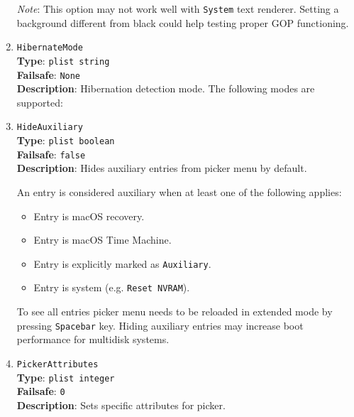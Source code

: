 \documentclass[]{article}
\providecommand{\tightlist}{%
  \setlength{\itemsep}{0pt}\setlength{\parskip}{0pt}}
\providecommand{\DIFaddtex}[1]{{\protect\color{blue}\uwave{#1}}} %
\providecommand{\DIFdeltex}[1]{{\protect\color{red}\sout{#1}}}                      %
\providecommand{\DIFaddbegin}{\global\booltrue{DIFkeeppage}\global\booltrue{DIFchange}} %
\providecommand{\DIFaddend}{\global\booltrue{DIFkeeppage}\global\boolfalse{DIFchange}} %
\providecommand{\DIFdelbegin}{\global\booltrue{DIFkeeppage}\global\booltrue{DIFchange}} %
\providecommand{\DIFdelend}{\global\booltrue{DIFkeeppage}\global\boolfalse{DIFchange}} %
\providecommand{\DIFadd}[1]{\texorpdfstring{\DIFaddtex{#1}}{#1}} %
\providecommand{\DIFdel}[1]{\texorpdfstring{\DIFdeltex{#1}}{}} %
\begin{document}
\begin{enumerate}
  \emph{Note}: This option may not work well with \texttt{System} text renderer.
  Setting a background different from black could help testing proper GOP functioning.

\item
  \texttt{HibernateMode}\\
  \textbf{Type}: \texttt{plist\ string}\\
  \textbf{Failsafe}: \texttt{None}\\
  \textbf{Description}: Hibernation detection mode. The following modes are supported:


\item
  \texttt{HideAuxiliary}\\
  \textbf{Type}: \texttt{plist\ boolean}\\
  \textbf{Failsafe}: \texttt{false}\\
  \textbf{Description}: Hides auxiliary entries from picker menu by default.

  An entry is considered auxiliary when at least one of the following applies:

  \begin{itemize}
  \tightlist
    \item Entry is macOS recovery.
    \item Entry is macOS Time Machine.
    \item Entry is explicitly marked as \texttt{Auxiliary}.
    \item Entry is system (e.g. \texttt{Reset NVRAM}).
  \end{itemize}

  To see all entries picker menu needs to be reloaded in extended mode by pressing
  \texttt{Spacebar} key. Hiding auxiliary entries may increase boot performance
  for multidisk systems.

\item
  \texttt{PickerAttributes}\\
  \textbf{Type}: \texttt{plist\ integer}\\
  \textbf{Failsafe}: \texttt{0}\\
  \textbf{Description}: Sets specific attributes for picker.


\end{enumerate}
\end{document}
